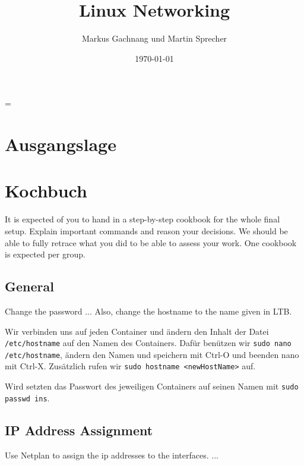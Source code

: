 \documentclass[11pt,titlepage]{article}
\title{Linux Networking}
\author{Markus Gachnang und Martin Sprecher}
\date{\today{}}
\newenvironment{shadedquotation}
 {\begin{shaded*}
  \quoting[leftmargin=0pt, vskip=0pt]
 }
 {\endquoting
 \end{shaded*}
}
\begin{document}
\sffamily
\maketitle
\newpage
\tableofcontents{}
\setcounter{page}{1}
\newpage
\RaggedRight
\emergencystretch=\maxdimen
{}

\section{Ausgangslage}
\label{sec:Ausgangslage}


\section{Kochbuch}
\label{sec:Kochbuch}

\begin{shadedquotation}
  It is expected of you to hand in a step-by-step cookbook for the whole final setup. Explain important commands and reason your decisions. We should be able to fully retrace what you did to be able to assess your work. One cookbook is expected per group.
\end{shadedquotation}

\subsection{General}
\label{subsec:General}
\begin{shadedquotation}
  Change the password ... Also, change the hostname to the name given in LTB.
\end{shadedquotation}

Wir verbinden uns auf jeden Container und ändern den Inhalt der Datei \lstinline{/etc/hostname} auf den Namen des Containers.
Dafür benützen wir \lstinline{sudo nano /etc/hostname}, ändern den Namen und speichern mit Ctrl-O und beenden nano mit Ctrl-X.
Zusätzlich rufen wir \lstinline{sudo hostname <newHostName>} auf.

Wird setzten das Passwort des jeweiligen Containers auf seinen Namen mit \lstinline{sudo passwd ins}.

\subsection{IP Address Assignment}
\label{subsec:IPAddressAssignment}
\begin{shadedquotation}
  Use Netplan to assign the ip addresses to the interfaces. ...
\end{shadedquotation}
\end{document}
